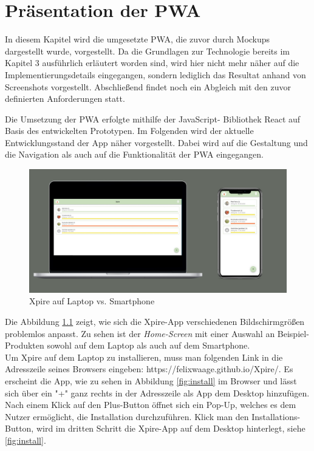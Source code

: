 \chapter{Präsentation der PWA}
In diesem Kapitel wird die umgesetzte PWA, die zuvor durch Mockups dargestellt wurde, vorgestellt. Da die Grundlagen zur Technologie bereits im Kapitel 3 ausführlich erläutert worden sind, wird hier nicht mehr näher auf die Implementierungsdetails eingegangen,
sondern lediglich das Resultat anhand von Screenshots vorgestellt. Abschließend findet noch ein Abgleich mit den zuvor definierten Anforderungen statt.

Die Umsetzung der PWA erfolgte mithilfe der JavaScript-
Bibliothek React auf Basis des entwickelten Prototypen. Im Folgenden wird der aktuelle Entwicklungsstand
der App näher vorgestellt. Dabei wird auf die Gestaltung
und die Navigation als auch auf die Funktionalität der PWA eingegangen.

\begin{figure}[h!]
	\centering
	\includegraphics[width=1.0\textwidth]{img/app.pdf}
	\caption{Xpire auf Laptop vs. Smartphone}
	\label{fig:app}
\end{figure}


Die Abbildung \ref{fig:app} zeigt, wie sich die Xpire-App verschiedenen Bildschirmgrößen problemlos anpasst. Zu sehen ist der \textit{Home-Screen} mit einer Auswahl an Beispiel-Produkten sowohl auf dem Laptop als auch auf dem Smartphone.\\
Um Xpire auf dem Laptop zu installieren, muss man folgenden Link in die Adresszeile seines Browsers eingeben: https://felixwaage.github.io/Xpire/. Es erscheint die App,  wie zu sehen in Abbildung \ref{fig:install} im Browser und lässt sich über ein "+" ganz rechts in der Adresszeile als App dem Desktop hinzufügen. Nach einem Klick auf den Plus-Button öffnet sich ein Pop-Up, welches es dem Nutzer ermöglicht, die Installation durchzuführen. Klick man den Installations-Button, wird im dritten Schritt die Xpire-App auf dem Desktop hinterlegt, siehe \ref{fig:install}.


